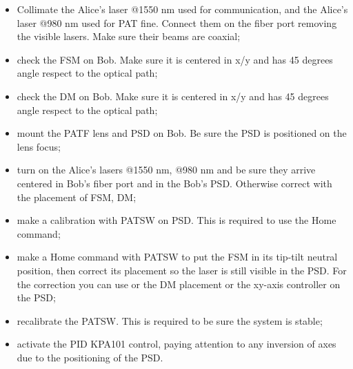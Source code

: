 \begin{itemize}
  \item Collimate the Alice's laser @1550 nm used for communication, and the Alice's laser @980 nm used for PAT fine. Connect them on the fiber port removing the visible lasers. Make sure their beams are coaxial;
  \item check the FSM on Bob. Make sure it is centered in x/y and has 45 degrees angle respect to the optical path;
  \item check the DM on Bob. Make sure it is centered in x/y and has 45 degrees angle respect to the optical path;
  \item mount the PATF lens and PSD on Bob. Be sure the PSD is positioned on the lens focus;
  \item turn on the Alice's lasers @1550 nm, @980 nm and be sure they arrive centered in Bob's fiber port and in the Bob's PSD. Otherwise correct with the placement of FSM, DM;
  \item make a calibration with PATSW on PSD. This is required to use the Home command;
  \item make a Home command with PATSW to put the FSM in its tip-tilt neutral position, then correct its placement so the laser is still visible in the PSD. For the correction you can use or the DM placement or the xy-axis controller on the PSD;
  \item recalibrate the PATSW. This is required to be sure the system is stable;
  \item activate the PID KPA101 control, paying attention to any inversion of axes due to the positioning of the PSD.
\end{itemize}

